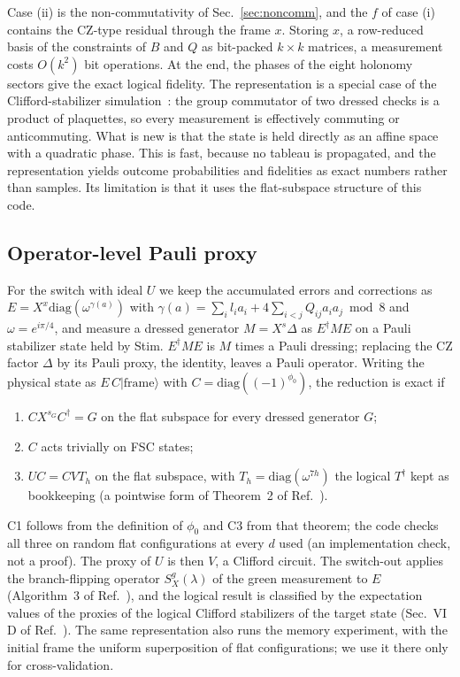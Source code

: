 \documentclass[a4paper]{article}
\providecommand{\ket}[1]{\ensuremath{|#1\rangle}}
\begin{document}
Case (ii) is the non-commutativity of Sec.~\ref{sec:noncomm}, and the $f$ of case (i) contains the CZ-type residual through the frame $x$. Storing $x$, a row-reduced basis of the constraints of $B$ and $Q$ as bit-packed $k\times k$ matrices, a measurement costs $O(k^2)$ bit operations. At the end, the phases of the eight holonomy sectors give the exact logical fidelity. The representation is a special case of the Clifford-stabilizer simulation~\cite{takada2026exact}: the group commutator of two dressed checks is a product of plaquettes, so every measurement is effectively commuting or anticommuting. What is new is that the state is held directly as an affine space with a quadratic phase. This is fast, because no tableau is propagated, and the representation yields outcome probabilities and fidelities as exact numbers rather than samples. Its limitation is that it uses the flat-subspace structure of this code.

\subsection{Operator-level Pauli proxy}
\label{sec:proxy}

For the switch with ideal $U$ we keep the accumulated errors and corrections as $E=X^x\mathrm{diag}(\omega^{\gamma(a)})$ with $\gamma(a)=\sum_il_ia_i+4\sum_{i<j}Q_{ij}a_ia_j \bmod 8$ and $\omega=e^{i\pi/4}$, and measure a dressed generator $M=X^s\Delta$ as $E^\dagger ME$ on a Pauli stabilizer state held by Stim. $E^\dagger ME$ is $M$ times a Pauli dressing; replacing the CZ factor $\Delta$ by its Pauli proxy, the identity, leaves a Pauli operator. Writing the physical state as $E\,C\ket{\mathrm{frame}}$ with $C=\mathrm{diag}((-1)^{\phi_0})$, the reduction is exact if
\begin{enumerate}[leftmargin=*,itemsep=0pt,label=(C\arabic*)]
\item $CX^{s_G}C^\dagger=G$ on the flat subspace for every dressed generator $G$;
\item $C$ acts trivially on FSC states;
\item $UC=CVT_h$ on the flat subspace, with $T_h=\mathrm{diag}(\omega^{7h})$ the logical $T^\dagger$ kept as bookkeeping (a pointwise form of Theorem~2 of Ref.~\cite{kobayashi2025clifford}).
\end{enumerate}
C1 follows from the definition of $\phi_0$ and C3 from that theorem; the code checks all three on random flat configurations at every $d$ used (an implementation check, not a proof). The proxy of $U$ is then $V$, a Clifford circuit. The switch-out applies the branch-flipping operator $S^g_X(\lambda)$ of the green measurement to $E$ (Algorithm~3 of Ref.~\cite{takada2026exact}), and the logical result is classified by the expectation values of the proxies of the logical Clifford stabilizers of the target state (Sec.~VI\,D of Ref.~\cite{takada2026exact}). The same representation also runs the memory experiment, with the initial frame the uniform superposition of flat configurations; we use it there only for cross-validation.
\end{document}
